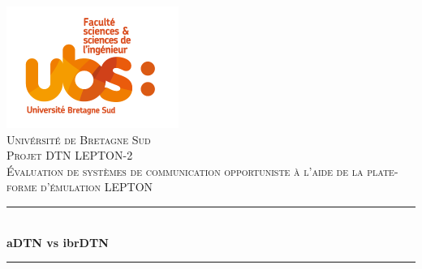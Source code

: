 \documentclass[a4paper,10pt]{article}
\begin{document}
\begin{titlepage}
    \begin{sffamily}
        \begin{center}


\includegraphics[scale=0.6]{images/logo.png}\\[1.5cm]
    

\textsc{\LARGE Univérsité de Bretagne Sud}\\[1.5cm]  %
\textsc{\Large Projet DTN LEPTON-2}\\[1cm]                %
\textsc{\large Évaluation de systèmes de communication opportuniste à l’aide de la plate-forme d’émulation LEPTON}\\[0.8cm]  %


    \newcommand{\HRule}{\rule{\linewidth}{0.5mm}} %
    
    \HRule \\[0.4cm]
    { \huge \bfseries aDTN vs ibrDTN\\[0.4cm] }
    \HRule \\[1.5cm]


\end{center}
\end{sffamily}
\end{titlepage}
\end{document}
